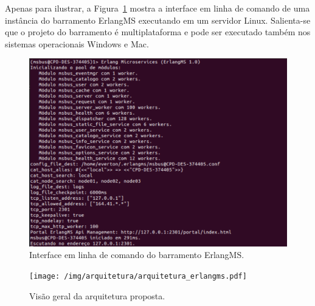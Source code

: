 Apenas para ilustrar, a Figura~\ref{fig:instancia_barramento} mostra
a interface em linha de comando de uma instância do
barramento ErlangMS executando em um servidor Linux. Salienta-se que
o projeto do barramento é multiplataforma e 
pode ser executado também nos sistemas operacionais
Windows e Mac.

\begin{figure}[htb]
\centering
\includegraphics[scale=0.87]{img/arquitetura/instancia_barramento.pdf}
\caption{Interface em linha de comando do barramento ErlangMS.}
\label{fig:instancia_barramento}
\end{figure}






\begin{figure}[htb]
\texttt{[image: /img/arquitetura/arquitetura\_erlangms.pdf]}
\caption{Vis\~{a}o geral da arquitetura proposta.}
\label{fig:arquitetura}
\end{figure}
